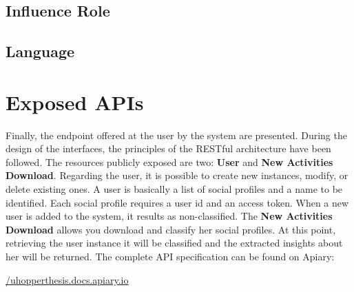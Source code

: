 \subsection{Influence Role}

\subsection{Language}


\section{Exposed APIs}
Finally, the endpoint offered at the user by the system are presented. During the design of the interfaces, the principles of the RESTful architecture have been followed.
The resources publicly exposed are two: \textbf{User} and \textbf{New Activities Download}.
Regarding the user, it is possible to create new instances, modify, or delete existing ones.
A user is basically a list of social profiles and a name to be identified. Each social profile requires a user id and an access token.
When a new user is added to the system, it results as non-classified. The \textbf{New Activities Download} allows you download and classify her social profiles.
At this point, retrieving the user instance it will be classified and the extracted insights about her will be returned.
The complete API specification can be found on Apiary:

\begin{center}
\url{/uhopperthesis.docs.apiary.io}
\end{center}
